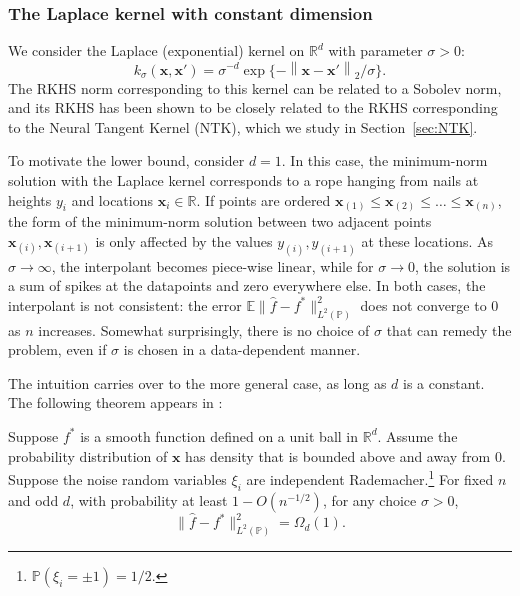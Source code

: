 \subsubsection{The Laplace kernel with constant dimension}

	We consider the Laplace (exponential) kernel on ${\mathbb R}^d$ with parameter $\sigma>0$:
	$$k_\sigma({\boldsymbol x},{\boldsymbol x}') = \sigma^{-d} \exp\{-\left\|{\boldsymbol x}-{\boldsymbol x}'\right\|_2/\sigma \}.$$
The RKHS norm corresponding to this kernel can be related to a Sobolev norm, and its RKHS has been shown \cite{bach2017breaking,geifman2020similarity,chen2020deep} to be closely related to the RKHS corresponding to the Neural Tangent Kernel (NTK), which we study in
Section~\ref{sec:NTK}.

To motivate the lower bound, consider $d=1$. In this case, the minimum-norm solution with the Laplace kernel corresponds to a rope hanging from nails at heights $y_i$ and locations ${\boldsymbol x}_i\in{\mathbb R}$. If points are ordered ${\boldsymbol x}_{(1)}\leq {\boldsymbol x}_{(2)}\leq \ldots \leq
{\boldsymbol x}_{(n)}$, the form of the minimum-norm solution between two adjacent points ${\boldsymbol x}_{(i)},{\boldsymbol x}_{(i+1)}$ is only affected by the values $y_{(i)},y_{(i+1)}$ at these locations. As $\sigma\to\infty$, the interpolant becomes piece-wise linear, while for $\sigma\to 0$, the solution is a sum of spikes at the datapoints and zero everywhere else. In both cases, the interpolant is not consistent: the error
$\mathbb{E}\|\widehat{f}-f^*\|^2_{L^2(\mathbb{P})}$ does not converge to $0$ as $n$ increases. Somewhat surprisingly, there is no choice of $\sigma$ that can remedy the problem, even if $\sigma$ is chosen in a data-dependent manner. 

The intuition carries over to the more general case, as long as $d$ is a constant. The following theorem appears in \cite{rakhlin2019consistency}:

\begin{theorem}
    Suppose $f^*$ is a smooth function defined on a unit ball in ${\mathbb R}^d$. Assume the probability distribution of ${\boldsymbol x}$ has density that is bounded above and away from $0$. Suppose the noise random variables $\xi_i$ are independent Rademacher.\footnote{$\mathbb{P}(\xi_i=\pm1)=1/2$.} For fixed $n$ and odd $d$, with probability at least $1-O(n^{-1/2})$, for any choice $\sigma>0$,
    $$\|\widehat{f}-f^*\|^2_{L^2(\mathbb{P})}  =  \Omega_d(1).$$
\end{theorem}

